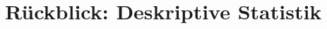 \documentclass[usenames,dvipsnames,handout]{beamer}
\begin{document}
%
%

\section{Rückblick: Deskriptive Statistik}
\end{document}

